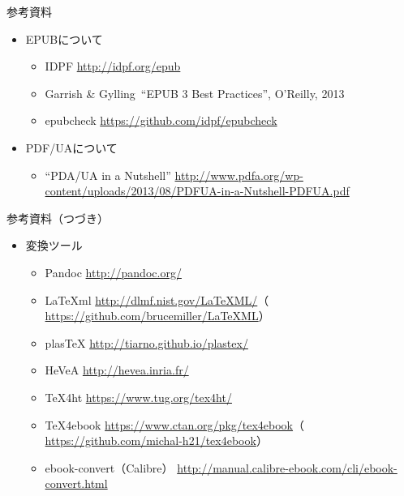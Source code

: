 \begin{frame}[t]{\inhibitglue 参考資料}
  \sffamily

  \begin{itemize}
    \item EPUBについて\\
    \begin{itemize}
      \item IDPF \url{http://idpf.org/epub}
      \item Garrish \& Gylling\, ``EPUB 3 Best Practices'', O'Reilly, 2013
      \item epubcheck \url{https://github.com/idpf/epubcheck}
    \end{itemize}
    \item PDF/UAについて\\
    \begin{itemize}
      \item ``PDA/UA in a Nutshell'' \url{http://www.pdfa.org/wp-content/uploads/2013/08/PDFUA-in-a-Nutshell-PDFUA.pdf}
    \end{itemize}
  \end{itemize}

\end{frame}

\begin{frame}[t]{\inhibitglue 参考資料（つづき）}
  \sffamily

  \begin{itemize}
    \item 変換ツール\\
    \begin{itemize}
      \item Pandoc \url{http://pandoc.org/}
      \item \LaTeX{}ml \url{http://dlmf.nist.gov/LaTeXML/}（ \url{https://github.com/brucemiller/LaTeXML}）
      \item plas\TeX{} \url{http://tiarno.github.io/plastex/}
      \item HeVeA \url{http://hevea.inria.fr/}
      \item \TeX{}4ht \url{https://www.tug.org/tex4ht/}
      \item \TeX{}4ebook \url{https://www.ctan.org/pkg/tex4ebook}（ \url{https://github.com/michal-h21/tex4ebook}）
      \item ebook-convert（Calibre） \url{http://manual.calibre-ebook.com/cli/ebook-convert.html}
    \end{itemize}
  \end{itemize}

\end{frame}

